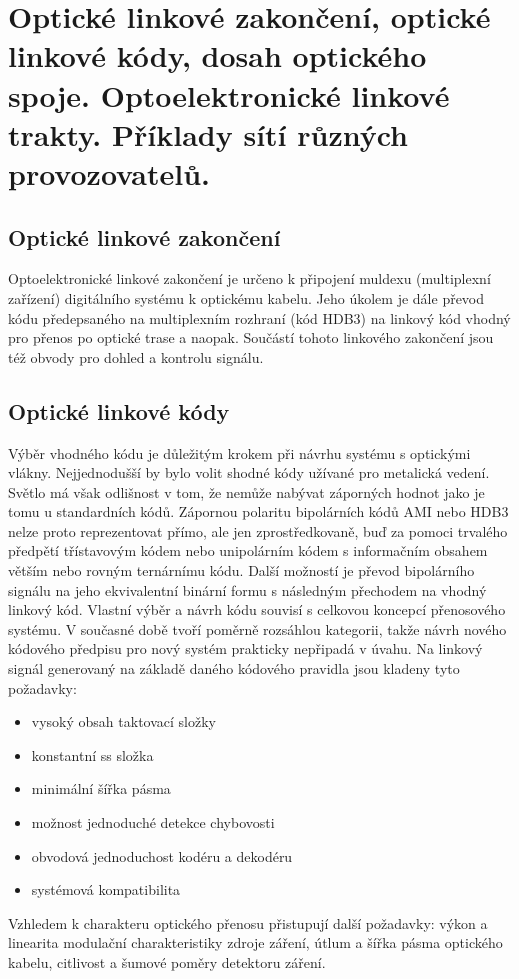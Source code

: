 \clearpage
\section{Optické linkové zakončení, optické linkové kódy, dosah optického spoje. Optoelektronické linkové trakty. Příklady sítí různých provozovatelů.}

\subsection{Optické linkové zakončení}
Optoelektronické linkové zakončení je určeno k připojení muldexu (multiplexní zařízení) digitálního systému k optickému kabelu. Jeho úkolem je dále převod kódu předepsaného na multiplexním rozhraní (kód HDB3) na linkový kód vhodný pro přenos po optické trase a naopak. Součástí tohoto linkového zakončení jsou též obvody pro dohled a kontrolu signálu.

\subsection{Optické linkové kódy}
Výběr vhodného kódu je důležitým krokem při návrhu systému s optickými vlákny. Nejjednodušší by bylo volit shodné kódy užívané pro metalická vedení. Světlo má však odlišnost v tom, že nemůže nabývat záporných hodnot jako je tomu u standardních kódů. Zápornou polaritu bipolárních kódů AMI nebo HDB3 nelze proto reprezentovat přímo, ale jen zprostředkovaně, buď za pomoci trvalého předpětí třístavovým kódem nebo unipolárním kódem s informačním obsahem větším nebo rovným ternárnímu kódu. Další možností je převod bipolárního signálu na jeho ekvivalentní binární formu s následným přechodem na vhodný linkový kód. Vlastní výběr a návrh kódu souvisí s celkovou koncepcí přenosového systému. V současné době tvoří poměrně rozsáhlou kategorii, takže návrh nového kódového předpisu pro nový systém prakticky nepřipadá v úvahu. Na linkový signál generovaný na základě daného kódového pravidla jsou kladeny tyto požadavky:
\begin{itemize}
    \item vysoký obsah taktovací složky
    \item konstantní ss složka
    \item minimální šířka pásma
    \item možnost jednoduché detekce chybovosti
    \item obvodová jednoduchost kodéru a dekodéru
    \item systémová kompatibilita
\end{itemize}
Vzhledem k charakteru optického přenosu přistupují další požadavky: výkon a linearita modulační charakteristiky zdroje záření, útlum a šířka pásma optického kabelu, citlivost a
šumové poměry detektoru záření.

